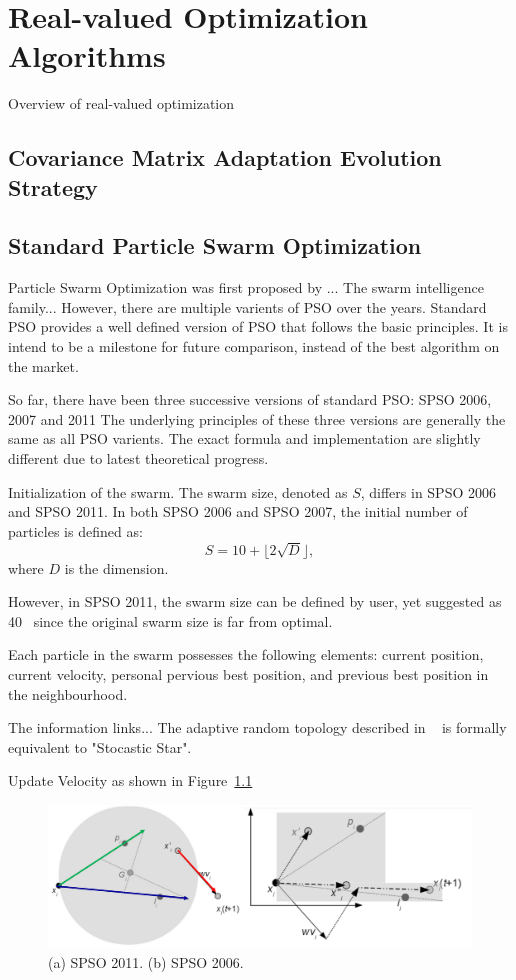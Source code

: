\chapter{Real-valued Optimization Algorithms}
\label{c:algos}

Overview of real-valued optimization

\section{Covariance Matrix Adaptation Evolution Strategy}


\section{Standard Particle Swarm Optimization}

Particle Swarm Optimization was first proposed by ...
The swarm intelligence family... 
However, there are multiple varients of PSO over the years.
Standard PSO provides a well defined version of PSO that follows the basic principles.
It is intend to be a milestone for future comparison, instead of the best algorithm on the market.

So far, there have been three successive versions of standard PSO: SPSO 2006, 2007 and 2011
The underlying principles of these three versions are generally the same as all PSO varients.
The exact formula and implementation are slightly different due to latest theoretical progress.

Initialization of the swarm.
The swarm size, denoted as $S$, differs in SPSO 2006 and SPSO 2011.
In both SPSO 2006 and SPSO 2007, the initial number of particles is defined as:
\begin{displaymath}
S = 10 + \lfloor 2\sqrt{D} \rfloor,
\end{displaymath}
where $D$ is the dimension.

However, in SPSO 2011, the swarm size can be defined by user, yet suggested as 40~\cite{Clerc:2012:SPSO2011} since the original swarm size is far from optimal.

Each particle in the swarm possesses the following elements: current position, current velocity, personal pervious best position, and previous best position in the neighbourhood. 

The information links...
The adaptive random topology described in ~\cite{Clerc:2007:randomTopology} is formally equivalent to "Stocastic Star".

Update Velocity as shown in Figure~\ref{fig:SPSO_update}
\begin{figure}
\centering
\includegraphics[width=\textwidth]{SPSO_update}
\caption{(a) SPSO 2011. (b) SPSO 2006.}\label{fig:SPSO_update}
\end{figure}

